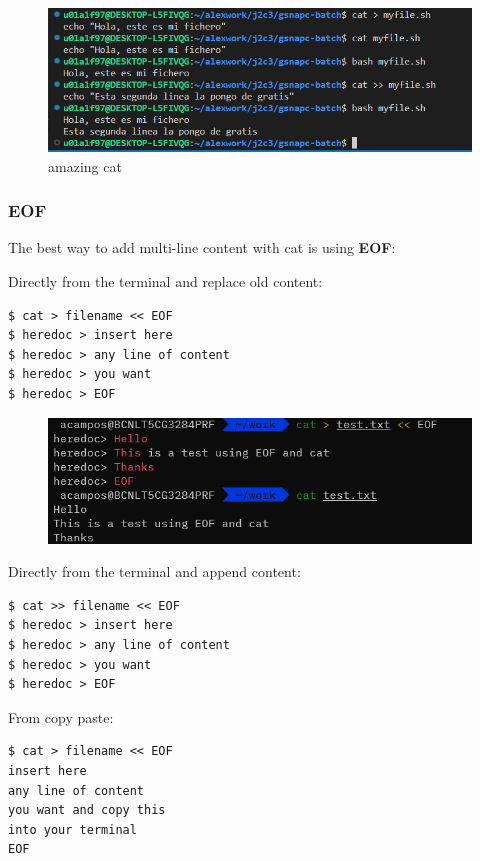 \documentclass{article}
\newenvironment{codetemplate}[1][]{%
  \mybasecolorbox[#1]
  \itshape
}{%
  \endmybasecolorbox
}
\begin{document}
\begin{figure}[H]
    \centering
    \includegraphics[scale=0.7]{pictures/image1.png}
    \caption{amazing cat}
\end{figure}

\subsubsection{EOF}

The best way to add multi-line content with cat is using \textbf{EOF}:

Directly from the terminal and replace old content:
\begin{codetemplate}{}
\begin{verbatim}
$ cat > filename << EOF
$ heredoc > insert here
$ heredoc > any line of content
$ heredoc > you want
$ heredoc > EOF
\end{verbatim}
\end{codetemplate}

\begin{figure}[H]
    \centering
    \includegraphics[scale=0.8]{pictures/eof.png}
\end{figure}

Directly from the terminal and append content:
\begin{codetemplate}{}
\begin{verbatim}
$ cat >> filename << EOF
$ heredoc > insert here
$ heredoc > any line of content
$ heredoc > you want
$ heredoc > EOF
\end{verbatim}
\end{codetemplate}

From copy paste:
\begin{codetemplate}{}
\begin{verbatim}
$ cat > filename << EOF
insert here
any line of content
you want and copy this
into your terminal
EOF
\end{verbatim}
\end{codetemplate}
\end{document}
